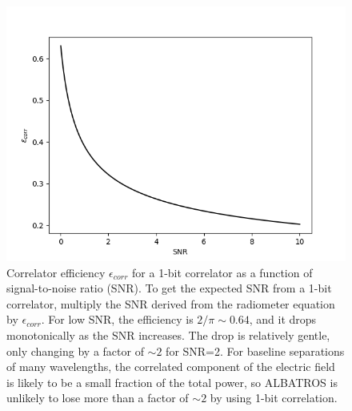 \documentclass{ws-jai}
\begin{document}
\begin{figure}
  \begin{center}
    \includegraphics[width=0.7\linewidth]{Figures/corr_efficiency/corr_efficiency.png}
    \caption{Correlator efficiency $\epsilon_{corr}$ for a 1-bit correlator as a function of signal-to-noise ratio (SNR).  To get the expected SNR from a 1-bit correlator, multiply the SNR derived from the radiometer equation by $\epsilon_{corr}$.  For low SNR, the efficiency is $2/\pi \sim 0.64$, and it drops monotonically as the SNR increases.  The drop is relatively gentle, only changing by a factor of $\sim 2$ for SNR=2.  For baseline separations of many wavelengths, the correlated component of the electric field is likely to be a small fraction of the total power, so ALBATROS is unlikely to lose more than a factor of $\sim 2$ by using 1-bit correlation.}
    \label{fig:1bit_efficiency}
    \end{center}
\end{figure}
\end{document}
